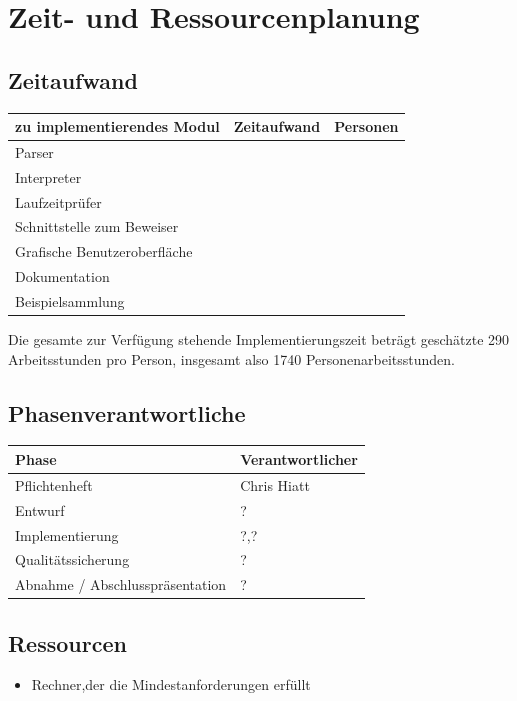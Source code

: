 \section{Zeit- und Ressourcenplanung}%

\subsection{Zeitaufwand}%

  \begin{tabular}{| l | l | l | }
    \hline
    zu implementierendes Modul & Zeitaufwand & Personen \\ \hline
    Parser &  &  \\ \hline
    Interpreter &  &  \\ \hline
    Laufzeitprüfer &  &  \\ \hline
    Schnittstelle zum Beweiser &  &  \\ \hline
    Grafische Benutzeroberfläche &  &  \\ \hline
    Dokumentation &  &  \\ \hline
    Beispielsammlung &  &  \\ \hline
    \hline
  \end{tabular}

Die gesamte zur Verfügung stehende Implementierungszeit beträgt geschätzte 290 Arbeitsstunden pro Person, insgesamt also 1740 Personenarbeitsstunden.

\subsection{Phasenverantwortliche}%

  \begin{tabular}{| l | l | }
    \hline
    Phase & Verantwortlicher \\ \hline
    Pflichtenheft & Chris Hiatt \\ \hline
    Entwurf & ? \\ \hline
    Implementierung & ?,? \\ \hline
    Qualitätssicherung & ? \\ \hline
    Abnahme / Abschlusspräsentation & ? \\ \hline
    \hline
  \end{tabular}

\subsection{Ressourcen}%

\begin{itemize}%
    \item Rechner,der die Mindestanforderungen erfüllt
\end{itemize}%


